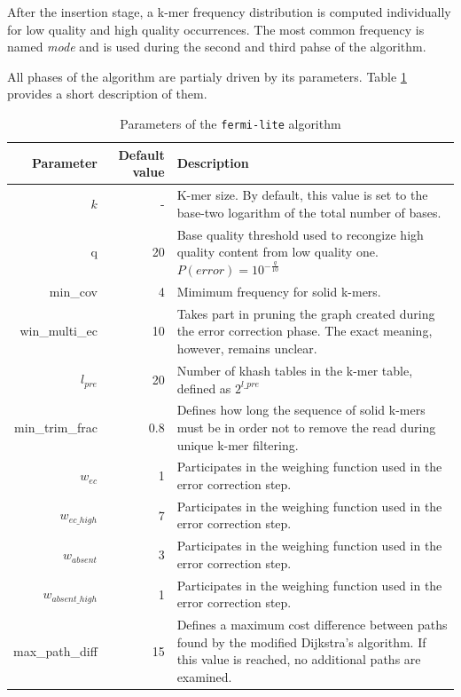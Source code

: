 After the insertion stage, a k-mer frequency distribution is computed individually for low quality and high quality occurrences. The most common frequency is named \textit{mode} and is used during the second and third pahse of the algorithm.

All phases of the algorithm are partialy driven by its parameters. Table \ref{tab:fermi-parameters} provides a short description of them.

\begin{table}[h]
\begin{center}
\caption{Parameters of the \texttt{fermi-lite} algorithm}
\label{tab:fermi-parameters}
\begin{tabular}{| r | r | p{5cm} |}
\hline
Parameter & Default value & Description \\
\hline
$k$ & - & K-mer size. By default, this value is set to the base-two logarithm of the total number of bases. \\
\hline
q & 20 & Base quality threshold used to recongize high quality content from low quality one. $P(error) = 10^{-\frac{q}{10}}$ \\
\hline
min\_cov & 4 & Mimimum frequency for solid k-mers. \\
\hline
win\_multi\_ec & 10 & Takes part in pruning the graph created during the error correction phase. The exact meaning, however, remains unclear. \\
\hline
$l_{pre}$ & 20 & Number of khash tables in the k-mer table, defined as $2^{l\_pre}$ \\
\hline
min\_trim\_frac & 0.8 &  Defines how long the sequence of solid k-mers must be in order not to remove the read during unique k-mer filtering. \\
\hline
$w_{ec}$ & 1 & Participates in the weighing function used in the error correction step.\\
\hline
$w_{ec\_high}$ & 7 & Participates in the weighing function used in the error correction step. \\
\hline
$w_{absent}$ & 3 & Participates in the weighing function used in the error correction step. \\
\hline
$w_{absent\_high}$ & 1 & Participates in the weighing function used in the error correction step. \\ 
\hline
max\_path\_diff & 15 & Defines a maximum cost difference between paths found by the modified Dijkstra's algorithm. If this value is reached, no additional paths are examined. \\ 
\hline
\end{tabular}
\end{center}
\end{table}

